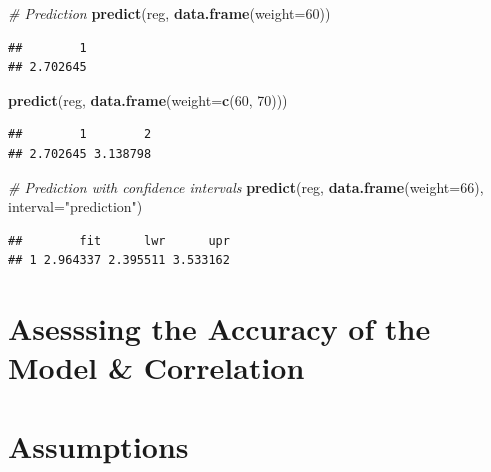\documentclass[]{article}
\newenvironment{Shaded}{\begin{snugshade}}{\end{snugshade}}
\newcommand{\CommentTok}[1]{\textcolor[rgb]{0.56,0.35,0.01}{\textit{#1}}}
\newcommand{\DataTypeTok}[1]{\textcolor[rgb]{0.13,0.29,0.53}{#1}}
\newcommand{\DecValTok}[1]{\textcolor[rgb]{0.00,0.00,0.81}{#1}}
\newcommand{\KeywordTok}[1]{\textcolor[rgb]{0.13,0.29,0.53}{\textbf{#1}}}
\newcommand{\NormalTok}[1]{#1}
\newcommand{\StringTok}[1]{\textcolor[rgb]{0.31,0.60,0.02}{#1}}
\begin{document}
\begin{Shaded}
\begin{Highlighting}[]
\CommentTok{# Prediction}
\KeywordTok{predict}\NormalTok{(reg, }\KeywordTok{data.frame}\NormalTok{(}\DataTypeTok{weight=}\DecValTok{60}\NormalTok{))}
\end{Highlighting}
\end{Shaded}

\begin{verbatim}
##        1 
## 2.702645
\end{verbatim}

\begin{Shaded}
\begin{Highlighting}[]
\KeywordTok{predict}\NormalTok{(reg, }\KeywordTok{data.frame}\NormalTok{(}\DataTypeTok{weight=}\KeywordTok{c}\NormalTok{(}\DecValTok{60}\NormalTok{, }\DecValTok{70}\NormalTok{)))}
\end{Highlighting}
\end{Shaded}

\begin{verbatim}
##        1        2 
## 2.702645 3.138798
\end{verbatim}

\begin{Shaded}
\begin{Highlighting}[]
\CommentTok{# Prediction with confidence intervals}
\KeywordTok{predict}\NormalTok{(reg, }\KeywordTok{data.frame}\NormalTok{(}\DataTypeTok{weight=}\DecValTok{66}\NormalTok{), }\DataTypeTok{interval=}\StringTok{"prediction"}\NormalTok{)}
\end{Highlighting}
\end{Shaded}

\begin{verbatim}
##        fit      lwr      upr
## 1 2.964337 2.395511 3.533162
\end{verbatim}

\hypertarget{asesssing-the-accuracy-of-the-model-correlation}{%
\section{Asesssing the Accuracy of the Model \&
Correlation}\label{asesssing-the-accuracy-of-the-model-correlation}}

\hypertarget{assumptions}{%
\section{Assumptions}\label{assumptions}}
\end{document}
